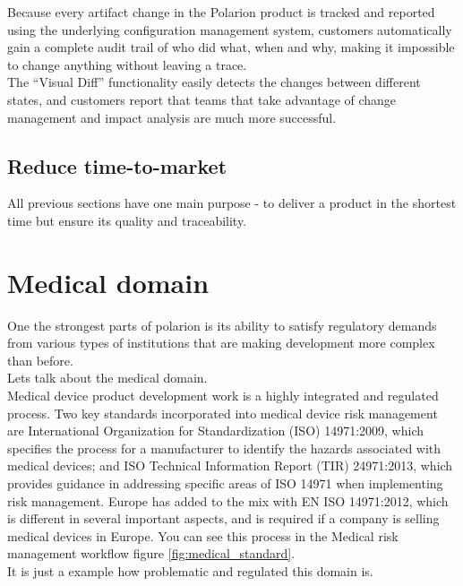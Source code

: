 \documentclass[thesis=M,english]{FITthesis}[2012/06/26]
\begin{document}
Because every artifact change in the Polarion product is tracked and reported using the underlying configuration management system, customers automatically gain a complete audit trail of who did what, when and why, making it impossible to change anything without leaving a trace.\\

The “Visual Diff” functionality easily detects the changes between different states, and customers report that teams that take advantage of change management and impact analysis are much more successful.

\subsection{Reduce time-to-market}

All previous sections have one main purpose - to deliver a product in the shortest time but ensure its quality and traceability.\\
 

\section{Medical domain}

One the strongest parts of \acrshort{polarion} is its ability to satisfy regulatory demands from various types of institutions that are making development more complex than before. \\

Lets talk about the medical domain.\\

Medical device product development work is a highly integrated and regulated process. Two key standards incorporated into medical device risk management are International Organization for Standardization (ISO) 14971:2009, which specifies the process for a manufacturer to identify the hazards associated with medical devices; and ISO Technical Information Report (TIR) 24971:2013, which provides guidance in addressing specific areas of ISO 14971 when implementing risk management. Europe has added to the mix with EN ISO 14971:2012, which is different in several important aspects, and is required if a company is selling medical devices in Europe. You can see this process in the Medical risk management workflow figure \ref{fig:medical_standard}.\\

It is just a example how problematic and regulated this domain is.\\
\end{document}
